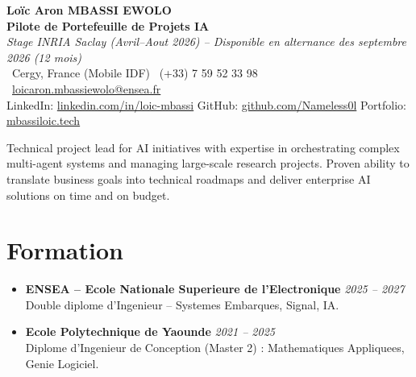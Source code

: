 \documentclass[a4paper,11pt]{article}
\begin{document}
\begin{center}
    {\Large \textbf{Lo\"ic Aron MBASSI EWOLO}} \\ \vspace{4pt}
    \textbf{\large Pilote de Portefeuille de Projets IA} \\
    \textit{\small Stage INRIA Saclay (Avril--Aout 2026) -- Disponible en alternance des septembre 2026 (12 mois)} \\ \vspace{4pt}
    \small
    \Pointinghand\ Cergy, France (Mobile IDF) \quad
    \Mobilefone\ (+33) 7 59 52 33 98 \quad
    {\color{primary}\Letter\ \href{mailto:loicaron.mbassiewolo@ensea.fr}{loicaron.mbassiewolo@ensea.fr}} \\ \vspace{2pt}
    {\color{primary}LinkedIn: \href{https://www.linkedin.com/in/loic-mbassi/}{linkedin.com/in/loic-mbassi}} \quad
    {\color{primary}GitHub: \href{https://github.com/Nameless0l}{github.com/Nameless0l}} \quad
    {\color{primary}Portfolio: \href{https://mbassiloic.tech}{mbassiloic.tech}}
\end{center}

\vspace{-6pt}

\noindent\small{Technical project lead for AI initiatives with expertise in orchestrating complex multi-agent systems and managing large-scale research projects. Proven ability to translate business goals into technical roadmaps and deliver enterprise AI solutions on time and on budget.}

\section{Formation}
\begin{itemize}[leftmargin=*, label=\tiny$\bullet$, nosep]
    \item \textbf{ENSEA -- Ecole Nationale Superieure de l'Electronique} \hfill \textit{2025 -- 2027} \\
    \small{Double diplome d'Ingenieur -- Systemes Embarques, Signal, IA.}
    \item \textbf{Ecole Polytechnique de Yaounde} \hfill \textit{2021 -- 2025} \\
    \small{Diplome d'Ingenieur de Conception (Master 2) : Mathematiques Appliquees, Genie Logiciel.}
\end{itemize}
\end{document}
